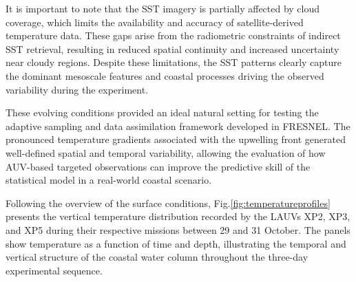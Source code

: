 It is important to note that the SST imagery is partially affected by
cloud coverage, which limits the availability and accuracy of
satellite-derived temperature data. These gaps arise from the
radiometric constraints of indirect SST retrieval, resulting in reduced
spatial continuity and increased uncertainty near cloudy regions.
Despite these limitations, the SST patterns clearly capture the dominant
mesoscale features and coastal processes driving the observed
variability during the experiment.

These evolving conditions provided an ideal natural setting for testing
the adaptive sampling and data assimilation framework developed in
FRESNEL. The pronounced temperature gradients associated with the
upwelling front generated well-defined spatial and temporal variability,
allowing the evaluation of how AUV-based targeted observations can
improve the predictive skill of the statistical model in a real-world
coastal scenario.


\begin{figure}
  \centering 



\end{figure}

Following the overview of the surface conditions,
Fig.\ref{fig:temperatureprofiles} presents the vertical temperature
distribution recorded by the LAUVs XP2, XP3, and XP5 during their
respective missions between 29 and 31 October. The panels show
temperature as a function of time and depth, illustrating the temporal
and vertical structure of the coastal water column throughout the
three-day experimental sequence.

